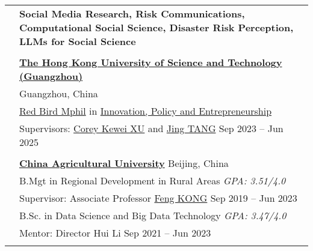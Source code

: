 \documentclass[letterpaper, 11pt]{article}
\begin{document}
\begin{longtable}{p{1.3in}p{4.8in}}



\nohyphens{\color{RoyalBlue}{Research Interests}}
& \bf{Social Media Research, Risk Communications, Computational Social Science, Disaster Risk Perception, LLMs for Social Science}\\
& \\



\color{RoyalBlue}{Education} 
& \textbf{\href{https://www.hkust-gz.edu.cn/}{The Hong Kong University of Science and Technology (Guangzhou)}} \\
& \hfill Guangzhou, China \\
& \href{https://www.hkust-gz.edu.cn/academics/teaching-and-learning-innovation/red-bird-mphil-program/}{Red Bird Mphil} in \href{https://www.hkust-gz.edu.cn/academics/hubs-and-thrust-areas/society-hub/innovation-policy-and-entrepreneurship/}{Innovation, Policy and Entrepreneurship} \\
& Supervisors: \href{https://facultyprofiles.hkust-gz.edu.cn/faculty-personal-page/XU-Kewei/coreyxu}{Corey Kewei XU} and \href{https://facultyprofiles.hkust-gz.edu.cn/faculty-personal-page/TANG-Jing/jingtang}{Jing TANG}  \hfill Sep 2023 -- Jun 2025\\
& \\

& \textbf{\href{http://en.cau.edu.cn/}{China Agricultural University}} \hfill Beijing, China\\
& B.Mgt in Regional Development in Rural Areas \hfill{\it GPA: 3.51/4.0} \\
& Supervisor: Associate Professor \href{https://cohd.cau.edu.cn/art/2020/11/27/art_48059_998984.html}{Feng KONG}  \hfill Sep 2019 -- Jun 2023\\
& B.Sc. in Data Science and Big Data Technology  \hfill{\it GPA: 3.47/4.0} \\
& Mentor: Director Hui Li \hfill Sep 2021 -- Jun 2023 \\
& \\



\end{longtable}
\end{document}
